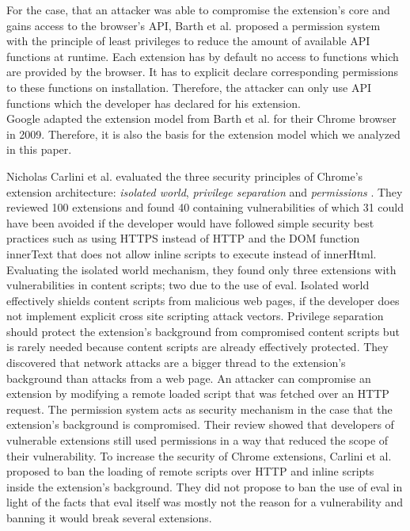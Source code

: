 	For the case, that an attacker was able to compromise the extension's core and gains access to the browser's API, Barth et al. proposed a permission system with the principle of least privileges to reduce the amount of available API functions at runtime. Each extension has by default no access to functions which are provided by the browser. It has to explicit declare corresponding permissions to these functions on installation. Therefore, the attacker can only use API functions which the developer has declared for his extension. \\
	Google adapted the extension model from Barth et al. for their Chrome browser in 2009. Therefore, it is also the basis for the extension model which we analyzed in this paper.
	
	Nicholas Carlini et al. evaluated the three security principles of Chrome's extension architecture: \textit{isolated world}, \textit{privilege separation} and \textit{permissions} \cite{Carlini:2012:EGC:2362793.2362800}. They reviewed 100 extensions and found 40 containing vulnerabilities of which 31 could have been avoided if the developer would have followed simple security best practices such as using HTTPS instead of HTTP and the DOM function innerText that does not allow inline scripts to execute instead of innerHtml. Evaluating the isolated world mechanism, they found only three extensions with vulnerabilities in content scripts; two due to the use of eval. Isolated world effectively shields content scripts from malicious web pages, if the developer does not implement explicit cross site scripting attack vectors. Privilege separation should protect the extension's background from compromised content scripts but is rarely needed because content scripts are already effectively protected. They discovered that network attacks are a bigger thread to the extension's background than attacks from a web page. An attacker can compromise an extension by modifying a remote loaded script that was fetched over an HTTP request. The permission system acts as security mechanism in the case that the extension's background is compromised. Their review showed that developers of vulnerable extensions still used permissions in a way that reduced the scope of their vulnerability. To increase the security of Chrome extensions, Carlini et al. proposed to ban the loading of remote scripts over HTTP and inline scripts inside the extension's background. They did not propose to ban the use of eval in light of the facts that eval itself was mostly not the reason for a vulnerability and banning it would break several extensions. 
	
